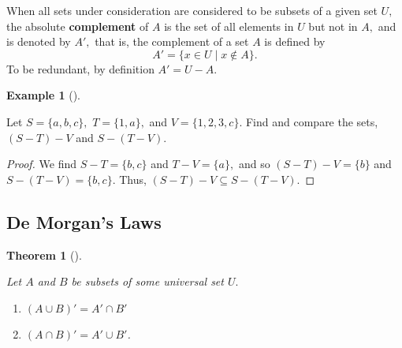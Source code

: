 \documentclass[
  letterpaper,
  10pt,
  reqno,
  twopage,
  openany]{book}
\providecommand{\tightlist}{%
  \setlength{\itemsep}{0pt}\setlength{\parskip}{0pt}}\usepackage{longtable,booktabs,array}
\theoremstyle{plain}
\theoremstyle{definition}
\theoremstyle{definition}
\theoremstyle{definition}
\newtheorem{example}{Example}[chapter]
\theoremstyle{plain}
\theoremstyle{plain}
\newtheorem{theorem}{Theorem}[chapter]
\theoremstyle{remark}
\begin{document}
When all sets under consideration are considered to be subsets of a
given set \(U,\) the absolute  \textbf{complement} of
\(A\) is the set of all elements in \(U\) but not in \(A,\) and is
denoted by \(A',\) that is, the complement of a set \(A\) is defined by
\[
A'=\{x\in U \mid x\not\in A\}. 
\] To be redundant, by definition \(A'=U-A.\)

\leavevmode{}%
\begin{example}[]\label{exm-relative-complement}

Let \(S=\{a,b,c\},\) \(T=\{1,a\},\) and \(V=\{1,2,3,c\}.\) Find and
compare the sets, \((S-T)-V\) and \(S-(T-V).\)

\end{example}

\begin{proof}

We find \(S-T=\{b,c\}\) and \(T-V=\{a\},\) and so \((S-T)-V=\{b\}\) and
\(S-(T-V)=\{b,c\}.\) Thus, \((S-T)-V\subseteq S-(T-V).\)

\end{proof}

\hypertarget{de-morgans-laws}{%
\subsection{De Morgan's Laws}\label{de-morgans-laws}}

\leavevmode{}%
\begin{theorem}[]\label{thm-de-morgans-laws}

Let \(A\) and \(B\) be subsets of some universal set \(U.\)

\begin{enumerate}
\def\labelenumi{\arabic{enumi}.}
\tightlist
\item
  \((A \cup B)'=A' \cap B'\)
\item
  \((A \cap B)'=A' \cup B'\).
\end{enumerate}

\end{theorem}
\end{document}
